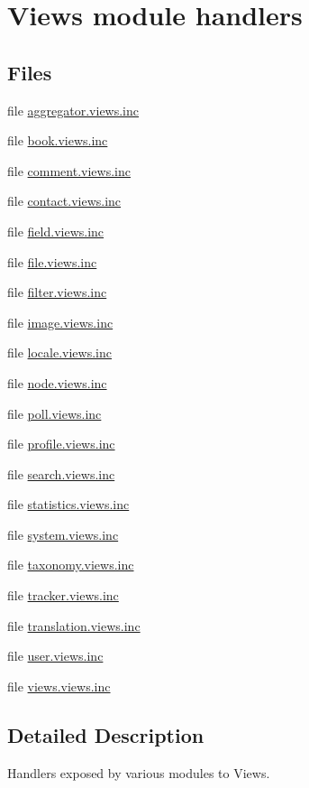 \hypertarget{group__views__module__handlers}{
\section{Views module handlers}
\label{group__views__module__handlers}
}
\subsection*{Files}
\begin{DoxyCompactItemize}
\item 
file \hyperlink{aggregator_8views_8inc}{aggregator.views.inc}
\item 
file \hyperlink{book_8views_8inc}{book.views.inc}
\item 
file \hyperlink{comment_8views_8inc}{comment.views.inc}
\item 
file \hyperlink{contact_8views_8inc}{contact.views.inc}
\item 
file \hyperlink{field_8views_8inc}{field.views.inc}
\item 
file \hyperlink{file_8views_8inc}{file.views.inc}
\item 
file \hyperlink{filter_8views_8inc}{filter.views.inc}
\item 
file \hyperlink{image_8views_8inc}{image.views.inc}
\item 
file \hyperlink{locale_8views_8inc}{locale.views.inc}
\item 
file \hyperlink{node_8views_8inc}{node.views.inc}
\item 
file \hyperlink{poll_8views_8inc}{poll.views.inc}
\item 
file \hyperlink{profile_8views_8inc}{profile.views.inc}
\item 
file \hyperlink{search_8views_8inc}{search.views.inc}
\item 
file \hyperlink{statistics_8views_8inc}{statistics.views.inc}
\item 
file \hyperlink{system_8views_8inc}{system.views.inc}
\item 
file \hyperlink{taxonomy_8views_8inc}{taxonomy.views.inc}
\item 
file \hyperlink{tracker_8views_8inc}{tracker.views.inc}
\item 
file \hyperlink{translation_8views_8inc}{translation.views.inc}
\item 
file \hyperlink{user_8views_8inc}{user.views.inc}
\item 
file \hyperlink{views_8views_8inc}{views.views.inc}
\end{DoxyCompactItemize}


\subsection{Detailed Description}
Handlers exposed by various modules to Views. 